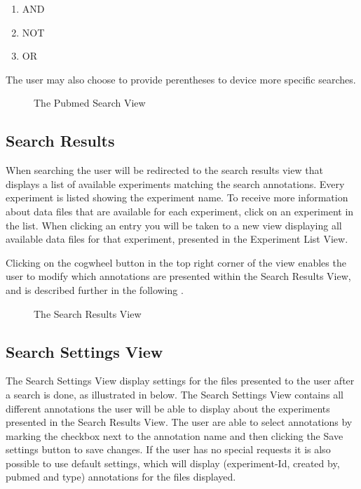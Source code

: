 \begin{enumerate}
\item AND
\item NOT
\item OR
\end{enumerate}

The user may also choose to provide perentheses to device more specific searches.

\begin{figure}[h]
\caption{The Pubmed Search View}
\label{fig:and_pubmed_man} 
\end{figure}
\FloatBarrier


\subsection{Search Results}
When searching the user will be redirected to the search results view  that displays a list
of available experiments matching the search annotations. Every experiment is listed showing 
the experiment name. To receive more information about data files that are available for each experiment,
click on an experiment in the list. When clicking an entry you will be taken to a new view displaying all
available data files for that experiment, presented in the Experiment List View. 

Clicking on the cogwheel button in the top right corner of the view enables the user to modify which annotations are presented within the Search Results View, and is described further in the following .

\begin{figure}[h]
\caption{The Search Results View}
\label{fig:and_search_results_man} 
\end{figure}
\FloatBarrier


\subsection{Search Settings View}\label{sec:search_settings}
The Search Settings View display settings for the files presented to the user after a search is done, as illustrated in   below. The Search Settings View contains all different annotations the user will be able to display about the experiments presented in the Search Results View. The user are able to select annotations by marking the checkbox next to the annotation name and then clicking the Save settings button to save changes. If the user has no special requests it is also possible to use default settings, which will display (experiment-Id, created by, pubmed and type) annotations for the files displayed. 



